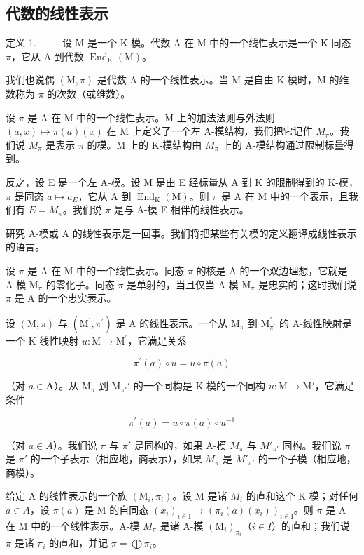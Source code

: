 \subsection{代数的线性表示}

定义 1. —— 设 M 是一个 K-模。代数 A 在 M 中的一个线性表示是一个 K-同态 \(\pi\)，它从 A 到代数 \(\operatorname{End}_{\mathrm{K}}(\mathrm{M})\)。

我们也说偶 \((\mathrm{M},\pi)\) 是代数 A 的一个线性表示。当 M 是自由 K-模时，M 的维数称为 \(\pi\) 的次数（或维数）。

设 \(\pi\) 是 A 在 M 中的一个线性表示。M 上的加法法则与外法则 \((a,x)\mapsto\pi(a)(x)\) 在 M 上定义了一个左 A-模结构，我们把它记作 \(M_{\pi}\)。我们说 \(M_{\pi}\) 是表示 \(\pi\) 的模。M 上的 K-模结构由 \(M_{\pi}\) 上的 A-模结构通过限制标量得到。

反之，设 E 是一个左 A-模。设 M 是由 E 经标量从 A 到 K 的限制得到的 K-模，\(\pi\) 是同态 \(a \mapsto a_{E}\)，它从 A 到 \(\operatorname{End}_{\mathrm{K}}(\mathrm{M})\)。则 \(\pi\) 是 A 在 M 中的一个表示，且我们有 \(E = M_{\pi}\)。我们说 \(\pi\) 是与 A-模 E 相伴的线性表示。

研究 A-模或 A 的线性表示是一回事。我们将把某些有关模的定义翻译成线性表示的语言。

设 \(\pi\) 是 A 在 M 中的一个线性表示。同态 \(\pi\) 的核是 A 的一个双边理想，它就是 A-模 \(\mathrm{M}_{\pi}\) 的零化子。同态 \(\pi\) 是单射的，当且仅当 A-模 \(\mathrm{M}_{\pi}\) 是忠实的；这时我们说 \(\pi\) 是 A 的一个忠实表示。

设 \((\mathrm{M},\pi)\) 与 \((\mathrm{M}^{\prime},\pi^{\prime})\) 是 A 的线性表示。一个从 \(\mathrm{M}_{\pi}\) 到 \(\mathrm{M}_{\pi^{\prime}}^{\prime}\) 的 A-线性映射是一个 K-线性映射 \(u:\mathrm{M}\to\mathrm{M}^{\prime}\)，它满足关系

\[
\pi^ {\prime} (a) \circ u = u \circ \pi (a)\tag{1}
\]

（对 \(a \in \mathbf{A}\)）。从 \(\mathrm{M}_{\pi}\) 到 \(\mathrm{M}_{\pi'}'\) 的一个同构是 K-模的一个同构 \(u: \mathrm{M} \to \mathrm{M}'\)，它满足条件

\[
\pi^ {\prime} (a) = u \circ \pi (a) \circ u ^ {- 1}\tag{2}
\]

（对 \(a \in A\)）。我们说 \(\pi\) 与 \(\pi'\) 是同构的，如果 A-模 \(M_{\pi}\) 与 \(M'_{\pi'}\) 同构。我们说 \(\pi\) 是 \(\pi'\) 的一个子表示（相应地，商表示），如果 \(M_{\pi}\) 是 \(M'_{\pi'}\) 的一个子模（相应地，商模）。

给定 A 的线性表示的一个族 \((\mathrm{M}_{i},\pi_{i})\)。设 M 是诸 \(M_{i}\) 的直和这个 K-模；对任何 \(a\in A\)，设 \(\pi(a)\) 是 M 的自同态 \((x_{i})_{i\in\mathrm{I}}\mapsto(\pi_{i}(a)(x_{i}))_{i\in\mathrm{I}}\)。则 \(\pi\) 是 A 在 M 中的一个线性表示。A-模 \(M_{\pi}\) 是诸 A-模 \((\mathrm{M}_{i})_{\pi_{i}}\)（\(i\in I\)）的直和；我们说 \(\pi\) 是诸 \(\pi_{i}\) 的直和，并记 \(\pi=\bigoplus\pi_{i}\)。

